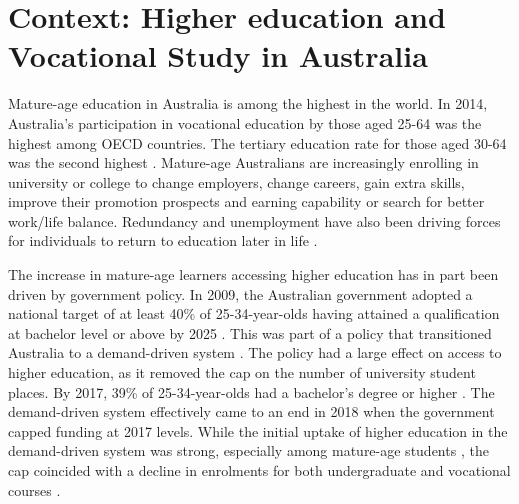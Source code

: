 \documentclass[12pt, a4paper]{article}
\begin{document}
%
%
\section{Context: Higher education and Vocational Study in Australia}

Mature-age education in Australia is among the highest in the world. In 2014, Australia's participation in vocational education by those aged 25-64 was the highest among OECD countries. The tertiary education rate for those aged 30-64 was the second highest \citep{perales2017}. Mature-age Australians are increasingly enrolling in university or college to change employers, change careers, gain extra skills, improve their promotion prospects and earning capability or search for better work/life balance. Redundancy and unemployment have also been driving forces for individuals to return to education later in life \citep{coelli2012}.

The increase in mature-age learners accessing higher education has in part been driven by government policy. In 2009, the Australian government adopted a national target of at least 40\% of 25-34-year-olds having attained a qualification at bachelor level or above by 2025 \citep{oshea2015}. This was part of a policy that transitioned Australia to a demand-driven system \citep{ua2020}. The policy had a large effect on access to higher education, as it removed the cap on the number of university student places. By 2017, 39\% of 25-34-year-olds had a bachelor’s degree or higher \citep{caruso2018}. The demand-driven system effectively came to an end in 2018 when the government capped funding at 2017 levels. While the initial uptake of higher education in the demand-driven system was strong, especially among mature-age students \citep{ua2019}, the cap coincided with a decline in enrolments for both undergraduate and vocational courses \citep{ua2020, atkinson2016, ncver2021}. 
\end{document}
